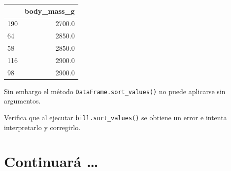 \documentclass[
  a4paper,
  noprof,
  12pt,
  notoc,
  nosols,
  nobib]{mnye}
\renewenvironment{exercise}[1][]{
            \if\relax\detokenize{#1}\relax
                \ex
            \else
                \ex[note={#1}]
            \fi
        }{\endex}
\theoremstyle{definition}
\newtheorem{exercise}{Ejercicio}[section]
\theoremstyle{remark}
\begin{document}
\begin{tabular}{lr}
\toprule
{} &  body\_mass\_g \\
\midrule
190 &       2700.0 \\
64  &       2850.0 \\
58  &       2850.0 \\
116 &       2900.0 \\
98  &       2900.0 \\
\bottomrule
\end{tabular}

Sin embargo el método \texttt{DataFrame.sort\_values()} no puede
aplicarse sin argumentos.

\begin{exercise}[]%
\protect\hypertarget{exr-sort_values}{}\label{exr-sort_values}%
Verifica que al ejecutar \texttt{bill.sort\_values()} se obtiene un
error e intenta interpretarlo y corregirlo.

\end{exercise}


\hypertarget{continuaruxe1}{%
\section{Continuará \ldots{}}\label{continuaruxe1}}




\cleardoublepage
\printsols
\myprintbibliography[title=Bibliografía]
\end{document}
